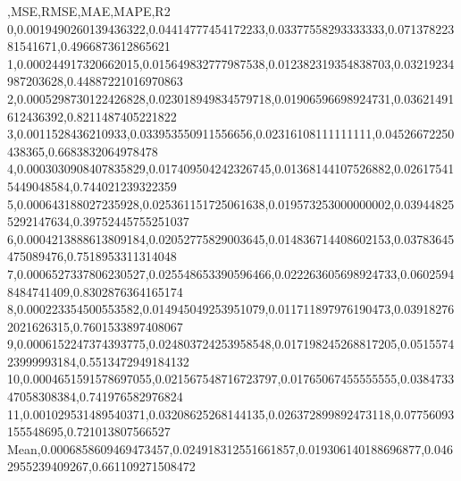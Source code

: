 ,MSE,RMSE,MAE,MAPE,R2
0,0.0019490260139436322,0.04414777454172233,0.03377558293333333,0.07137822381541671,0.4966873612865621
1,0.000244917320662015,0.015649832777987538,0.012382319354838703,0.03219234987203628,0.44887221016970863
2,0.0005298730122426828,0.023018949834579718,0.01906596698924731,0.03621491612436392,0.8211487405221822
3,0.0011528436210933,0.033953550911556656,0.02316108111111111,0.04526672250438365,0.6683832064978478
4,0.0003030908407835829,0.017409504242326745,0.01368144107526882,0.026175415449048584,0.744021239322359
5,0.000643188027235928,0.025361151725061638,0.019573253000000002,0.039448255292147634,0.39752445755251037
6,0.0004213888613809184,0.02052775829003645,0.014836714408602153,0.03783645475089476,0.7518953311314048
7,0.0006527337806230527,0.025548653390596466,0.022263605698924733,0.06025948484741409,0.8302876364165174
8,0.000223354500553582,0.014945049253951079,0.011711897976190473,0.039182762021626315,0.7601533897408067
9,0.0006152247374393775,0.024803724253958548,0.017198245268817205,0.051557423999993184,0.5513472949184132
10,0.0004651591578697055,0.021567548716723797,0.01765067455555555,0.038473347058308384,0.741976582976824
11,0.001029531489540371,0.03208625268144135,0.026372899892473118,0.07756093155548695,0.721013807566527
Mean,0.0006858609469473457,0.024918312551661857,0.019306140188696877,0.0462955239409267,0.661109271508472
